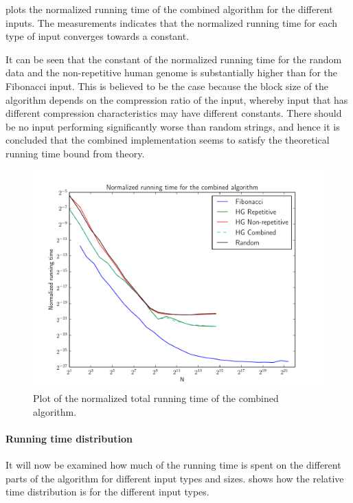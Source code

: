 \documentclass[twoside,11pt,openright]{report}
\begin{document}
 plots the normalized running time of the combined algorithm for the different inputs. The measurements indicates that the normalized running time for each type of input converges towards a constant.

It can be seen that the constant of the normalized running time for the random data and the non-repetitive human genome is substantially higher than for the Fibonacci input. This is believed to be the case because the block size of the algorithm depends on the compression ratio of the input, whereby input that has different compression characteristics may have different constants. There should be no input performing significantly worse than random strings, and hence it is concluded that the combined implementation seems to satisfy the theoretical running time bound from theory.
\begin{figure}[h!]
  \centering
  \includegraphics[width=13cm]{combined/total_runningtime}
  \caption{Plot of the normalized total running time of the combined algorithm.}
  \label{fig:benchmark:total-time-combined}
\end{figure}

\clearpage
\paragraph{Running time distribution}
It will now be examined how much of the running time is spent on the different parts of the algorithm for different input types and sizes.  shows how the relative time distribution is for the different input types.
\end{document}
